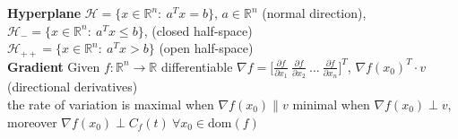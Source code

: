 \documentclass[a4paper]{article}
\begin{document}
\textbf{Hyperplane} $\mathcal{H}=\{x\in\mathbb{R}^n: \ a^T x = b\}$, $a\in \mathbb{R}^n$ (normal direction), 
$\mathcal{H}_{-} = \{x\in\mathbb{R}^n: \ a^T x \le b \}$, (closed half-space) \\
$\mathcal{H}_{++}=\{x\in\mathbb{R}^n: \ a^T x > b\}$ (open half-space)\\
\textbf{Gradient} Given $f:\mathbb{R}^n\to\mathbb{R}$ differentiable $\nabla{f}=\bigg[
    \frac{\partial f}{\partial x_1} \ \frac{\partial f}{\partial x_2}\ ... \ \frac{\partial f}{\partial x_n}
\bigg]^T$, $\nabla{f}(x_0)^T \cdot v $ (directional derivatives)\\
\textsf{the rate of variation is maximal} when $\nabla{f}(x_0)  \parallel v $ \textsf{minimal when} $\nabla{f}(x_0) \perp v$, moreover $\nabla{f}(x_0)\perp C_f(t) \ \forall x_0 \in \text{dom}(f)$
\end{document}

